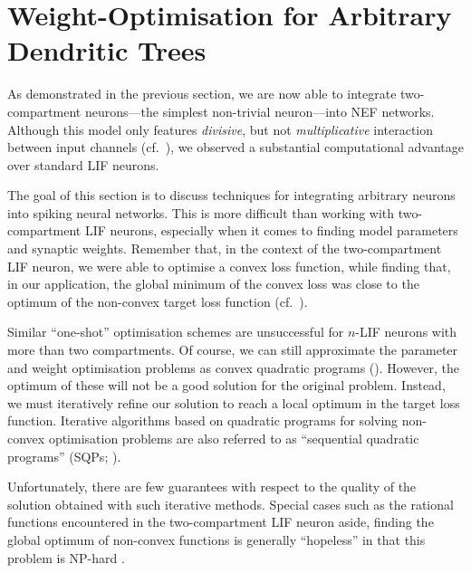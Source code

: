 
\section{Weight-Optimisation for Arbitrary Dendritic Trees}
\label{sec:nlif_opt}

As demonstrated in the previous section, we are now able to integrate two-compartment \LIF neurons---the simplest non-trivial \nlif neuron---into NEF networks.
Although this model only features \emph{divisive}, but not \emph{multiplicative} interaction between input channels (cf.~), we observed a substantial computational advantage over standard LIF neurons.

The goal of this section is to discuss techniques for integrating arbitrary \nlif neurons into spiking neural networks.
This is more difficult than working with two-compartment LIF neurons, especially when it comes to finding model parameters and synaptic weights.
Remember that, in the context of the two-compartment LIF neuron, we were able to optimise a convex loss function, while finding that, in our application, the global minimum of the convex loss was close to the optimum of the non-convex target loss function (cf.~).

Similar \enquote{one-shot} optimisation schemes are unsuccessful for $n$-LIF neurons with more than two compartments.
Of course, we can still approximate the parameter and weight optimisation problems as convex quadratic programs (\QPpl).
However, the optimum of these \QPpl will not be a good solution for the original problem.
Instead, we must iteratively refine our solution to reach a local optimum in the target loss function.
Iterative algorithms based on quadratic programs for solving non-convex optimisation problems are also referred to as \enquote{sequential quadratic programs} (SQPs; \cite[e.g.,][Chapter~18]{nocedal2006numerical}).

Unfortunately, there are few guarantees with respect to the quality of the solution obtained with such iterative methods.
Special cases such as the rational functions encountered in the two-compartment LIF neuron aside, finding the global optimum of non-convex functions is generally \enquote{hopeless} in that this problem is NP-hard \citep[e.g.,]{sun2016when}.

